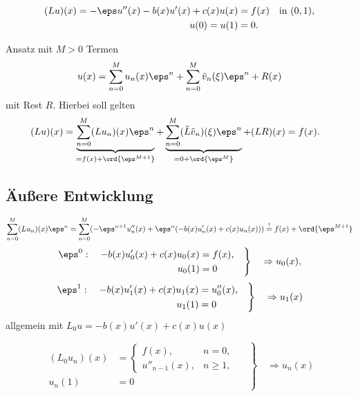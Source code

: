 \begin{align*}
  (Lu)(x)=-\eps u''(x)-b(x) u'(x)+c(x)u(x)&=f(x)\quad\mbox{in }(0,1),\\
  u(0)=u(1)&=0.
\end{align*}


Ansatz mit $M>0$ Termen
\[
u(x)=\sum_{n=0}^Mu_n(x)\eps^n+\sum_{n=0}^M\tilde v_n(\xi)\eps^n+R(x)
\]
mit Rest $R$. Hierbei soll gelten
\begin{align*}
  (Lu)(x)= \underbrace{\sum_{n=0}^M(Lu_n)(x)\eps^n}_{=f(x)+\ord{\eps^{M+1}}}
  +\underbrace{\sum_{n=0}^M(\tilde L\tilde v_n)(\xi)\eps^n}_{=0+\ord{\eps^{M}}}+(LR)(x)&=f(x).
\end{align*}
\subsection*{Äußere Entwicklung}
\[
\sum_{n=0}^M(Lu_n)(x)\eps^n
= \sum_{n=0}^M(-\eps^{n+1} u''_n(x)+\eps^n(-b(x)u'_n(x)+c(x)u_n(x)))\stackrel{!}{=}f(x)+\ord{\eps^{M+1}}
\]
\[
\left.
  \begin{aligned}
    \eps^0:\quad -b(x)u'_0(x)+c(x)u_0(x) &= f(x),\\
    u_0(1) &= 0
  \end{aligned}\quad
\right\}\quad\Rightarrow
u_0(x),
\]
\[
\left.
  \begin{aligned}
    \eps^1:\quad -b(x)u'_1(x)+c(x)u_1(x) &= u''_0(x),\\
    u_1(1) &= 0
  \end{aligned}\quad
\right\}\quad\Rightarrow
u_1(x)
\]
allgemein mit $L_0u=-b(x)u'(x)+c(x)u(x)$

\begin{equation}
  \left.
    \begin{aligned}
      (L_0 u_n)(x)&=\begin{cases}
        f(x),&n=0,\\
        u''_{n-1}(x),&n\geq 1,
      \end{cases}\\
      u_n(1)&=0
    \end{aligned}
    \quad
  \right\}
  \quad\Rightarrow
  u_n(x)\label{eq:un}
\end{equation}


